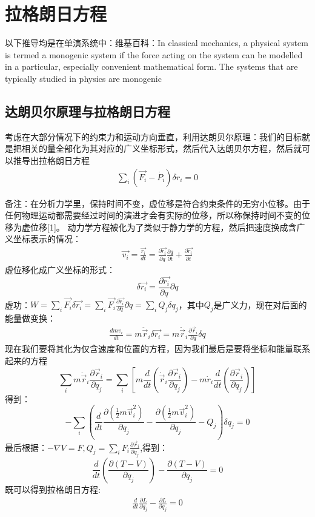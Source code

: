 \documentclass[UTF8,10pt]{article}
\begin{document}
\section{拉格朗日方程}
以下推导均是在单演系统中：维基百科：In classical mechanics, a physical system is termed a monogenic system if the force acting on the system can be modelled in a particular, especially convenient mathematical form. The systems that are typically studied in physics are monogenic
\subsection{达朗贝尔原理与拉格朗日方程}
考虑在大部分情况下的约束力和运动方向垂直，利用达朗贝尔原理：我们的目标就是把相关的量全部化为其对应的广义坐标形式，然后代入达朗贝尔方程，然后就可以推导出拉格朗日方程
\begin{align*}
    \sum_i (\vec{F_i}-\dot{P_i})\delta r_i =0
\end{align*}

备注：在分析力学里，保持时间不变，虚位移是符合约束条件的无穷小位移。由于任何物理运动都需要经过时间的演进才会有实际的位移，所以称保持时间不变的位移为虚位移[1]。
动力学方程被化为了类似于静力学的方程，然后把速度换成含广义坐标表示的情况：
\begin{align*}
    \vec{v_i}=\frac{\vec{r_i}}{dt}=\frac{\partial \vec{r_i}}{\partial q}\frac{\partial q}{\partial t}+\frac{\partial \vec{r_i}}{\partial t}
\end{align*}
虚位移化成广义坐标的形式：
\[\delta \vec{r_i}=\frac{\partial \vec{r_i}}{\partial q}\partial q\]
虚功：$W=\sum_i \vec{F_i}\delta \vec{r_i}=\sum_i \vec{F_i}\frac{\partial\vec{r_i}}{\partial q} \partial q=\sum_i Q_j \delta q_j$，其中$Q_j$是广义力，现在对后面的能量做变换：
\begin{align*}
    \frac{d mv_i}{dt}=m\ddot{\vec{r}}_i\delta \vec{r_i}=m\ddot{\vec{r}}_i\frac{\partial\vec{r}_i}{\partial q}\delta q
\end{align*}
现在我们要将其化为仅含速度和位置的方程，因为我们最后是要将坐标和能量联系起来的方程
$$\sum_{i} m \ddot{\vec{r}}_{i} \frac{\partial \vec{r}_{i}}{\partial q_{j}}=\sum_{i} \left[ m \frac{d}{d t}\left(\dot{\vec{r}}_{i} \frac{\partial \vec{r}_{i}}{\partial q_{j}}\right)-m \dot{r}_{i} \frac{d}{d t}\left(\frac{\partial \vec{r}_{i}}{\partial q_{j}}\right)\right]$$
得到：
$$-\sum_{i}\left(\frac{d}{d t} \frac{\partial\left(\frac{1}{2} m \vec{v}_{i}^{2}\right)}{\partial \dot{q}_{j}}-\frac{\partial\left(\frac{1}{2} m \vec{v}_{i}^{2}\right)}{\partial q_{j}}-Q_{j}\right) \delta q_{j}=0$$
最后根据：$-\nabla V=F,Q_j=\sum_i F_i\frac{\partial \vec{r}_i}{\partial q_j}$,得到：
$$\frac{d}{d t}\left(\frac{\partial(T-V)}{\partial \dot{q}_{j}}\right)-\frac{\partial(T-V)}{\partial q_{j}}=0$$
既可以得到拉格朗日方程:
\begin{align*}
    \frac{d}{dt}\frac{\partial L}{\partial \dot{q}_j}-
    \frac{\partial L}{\partial q_j}=0
\end{align*}
\end{document}
